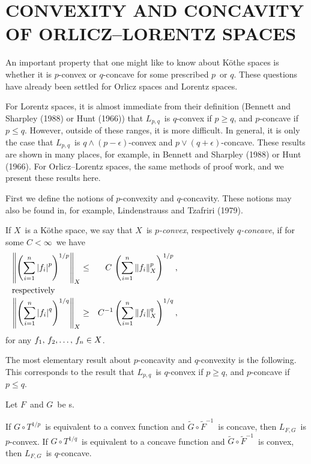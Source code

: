 \section{CONVEXITY AND CONCAVITY OF ORLICZ--LORENTZ SPACES}

An important property that one might like to know about K\"othe spaces is
whether it is $p$-convex or $q$-concave for some prescribed $p$\ or $q$. 
These
questions have already been settled for Orlicz spaces and Lorentz spaces. 

For
Lorentz spaces, it is almost immediate from their definition (Bennett and
Sharpley (1988) or Hunt (1966)) 
that $L_{p,q}$\ is $q$-convex if $p\ge q$, and $p$-concave if $p\le q$.
However, outside of these ranges, it is more difficult. In general, it is 
only
the case that $L_{p,q}$\ is $q\wedge(p-\epsilon)$-convex and
$p\vee(q+\epsilon)$-concave. These results are shown in many places, for 
example,
in Bennett and
Sharpley (1988) or Hunt (1966). For Orlicz--Lorentz spaces, the same 
methods of proof
work, and we present these results here.

First we define the notions of $p$-convexity and $q$-concavity. These notions
may also be found in, for example, Lindenstrauss and Tzafriri (1979).

\begin{defin} If $X$\ is a K\"othe space, we
say that $X$\ is {\em $p$-convex}, respectively
{\em $q$-concave}, if for some $C<\infty$\ we have
\begin{eqnarray*}
   \normo{\left(\sum_{i=1}^n \modo{f_i}^p\right)^{1/p}}_X
   &\le& C \, \left(\sum_{i=1}^n \normo{f_i}_X^p\right)^{1/p} ,\\
\noalign{\noindent respectively}
   \normo{\left(\sum_{i=1}^n \modo{f_i}^q\right)^{1/q}}_X
   &\ge& C^{-1} \left(\sum_{i=1}^n \normo{f_i}_X^q\right)^{1/q} ,
\end{eqnarray*}
for any $\listit f,n \in X$. 
\end{defin}

The most elementary result about $p$-concavity and $q$-convexity is the
following. This corresponds to the result that $L_{p,q}$\ is $q$-convex if
$p\ge q$, and $p$-concave if $p\le q$.

\begin{thm} Let $F$\ and $G$\ be \phifunction s.
\begin{itemrom}
\itemi If $G\circ T^{1/p}$\ is equivalent to a convex function and
$\tilde G\circ \tilde F^{-1}$\ is concave, then $L_{F,G}$\ is $p$-convex.
\itemii If $G\circ T^{1/q}$\ is equivalent to a concave function and
$\tilde G\circ \tilde F^{-1}$\ is convex, then $L_{F,G}$\ is $q$-concave.
\end{itemrom}
\end{thm}

